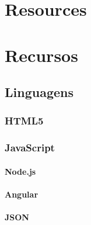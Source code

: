 %
%


\lang
{\chapter[Appendix A]{Resources}}
{\chapter[Apêndice A]{Recursos}}



 



%
\newpage

\section{Linguagens}
\subsection{HTML5}


\subsection{JavaScript}
\subsubsection{Node.js}
\subsubsection{Angular}
\subsubsection{JSON}



